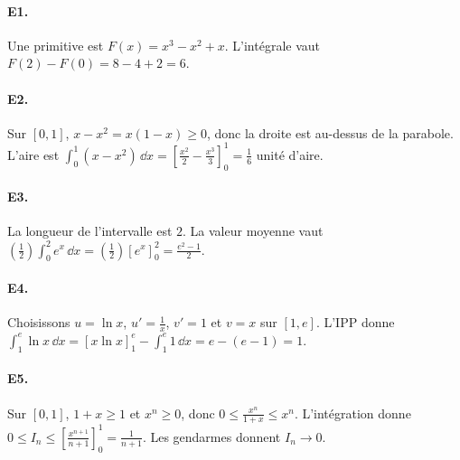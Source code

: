 \paragraph{E1.}Une primitive est $F(x)=x^3-x^2+x$. L'intégrale vaut $F(2)-F(0)=8-4+2=6$.

\paragraph{E2.}Sur $[0,1]$, $x-x^2=x(1-x)\ge0$, donc la droite est au-dessus de la parabole. L'aire est $\int_0^1(x-x^2)\,\dd x=[\frac{x^2}{2}-\frac{x^3}{3}]_0^1=\frac{1}{6}$ unité d'aire.

\paragraph{E3.}La longueur de l'intervalle est $2$. La valeur moyenne vaut $(\frac{1}{2})\int_0^2e^x\,\dd x=(\frac{1}{2})[e^x]_0^2=\frac{e^2-1}{2}$.

\paragraph{E4.}Choisissons $u=\ln x$, $u'=\frac{1}{x}$, $v'=1$ et $v=x$ sur $[1,e]$. L'IPP donne $\int_1^e\ln x\,\dd x=[x\ln x]_1^e-\int_1^e1\,\dd x=e-(e-1)=1$.

\paragraph{E5.}Sur $[0,1]$, $1+x\ge1$ et $x^n\ge0$, donc $0\le \frac{x^n}{1+x}\le x^n$. L'intégration donne $0\le I_n\le[\frac{x^{n+1}}{n+1}]_0^1=\frac{1}{n+1}$. Les gendarmes donnent $I_n\to0$.

